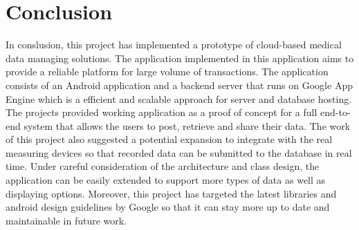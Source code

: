 \section{Conclusion}
In conslusion, this project has implemented a prototype of cloud-based medical data managing solutions. The application
implemented in this application aims to provide a reliable platform for large volume of transactions. The application
consists of an Android application and a backend server that runs on Google App Engine which is a efficient and scalable
approach for server and database hosting. The projects provided working application as a proof of concept for a full
end-to-end system that allows the users to post, retrieve and share their data. The work of this project also suggested
a potential expansion to integrate with the real measuring devices so that recorded data can be submitted to the
database in real time. Under careful consideration of the architecture and class design, the application can be easily
extended to support more types of data as well as displaying options. Moreover, this project has targeted the latest
libraries and android design guidelines by Google so that it can stay more up to date and maintainable in future work.
\vfill

 


